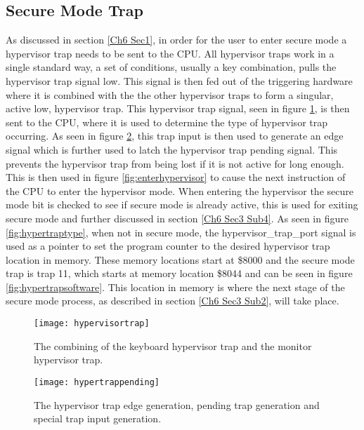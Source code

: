\label{Ch6 Sec3}


\subsection{Secure Mode Trap}

\label{Ch6 Sec3 Sub1}

As discussed in section \ref{Ch6 Sec1}, in order for the user to enter secure mode a hypervisor trap needs to be sent to the CPU. All hypervisor traps work in a single standard way, a set of conditions, usually a key combination, pulls the hypervisor trap signal low. This signal is then fed out of the triggering hardware where it is combined with the the other hypervisor traps to form a singular, active low, hypervisor trap. This hypervisor trap signal, seen in figure \ref{fig:hypervisortrap}, is then sent to the CPU, where it is used to determine the type of hypervisor trap occurring. As seen in figure \ref{fig:hypertrappending}, this trap input is then used to generate an edge signal which is further used to latch the hypervisor trap pending signal. This prevents the hypervisor trap from being lost if it is not active for long enough. This is then used in figure \ref{fig:enterhypervisor} to cause the next instruction of the CPU to enter the hypervisor mode. When entering the hypervisor the secure mode bit is checked to see if secure mode is already active, this is used for exiting secure mode and further discussed in section \ref{Ch6 Sec3 Sub4}. As seen in figure \ref{fig:hypertraptype}, when not in secure mode, the hypervisor\_trap\_port signal is used as a pointer to set the program counter to the desired hypervisor trap location in memory. These memory locations start at \$8000 and the secure mode trap is trap 11, which starts at memory location \$8044 and can be seen in figure \ref{fig:hypertrapsoftware}. This location in memory is where the next stage of the secure mode process, as described in section \ref{Ch6 Sec3 Sub2}, will take place.

\begin{figure}
  \centering
  \texttt{[image: hypervisortrap]}
  \caption{The combining of the keyboard hypervisor trap and the monitor hypervisor trap.}
  \label{fig:hypervisortrap}
\end{figure}

\begin{figure}
  \centering
  \texttt{[image: hypertrappending]}
  \caption{The hypervisor trap edge generation, pending trap generation and special trap input generation.}
  \label{fig:hypertrappending}
\end{figure}

